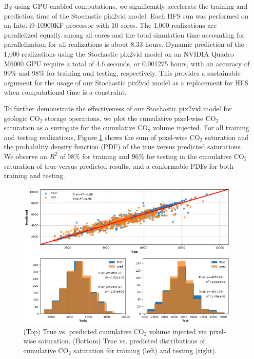 \documentclass[10pt, twoside]{article}
\begin{document}
By using GPU-enabled computations, we significantly accelerate the training and prediction time of the Stochastic pix2vid model. Each HFS run was performed on an Intel \textregistered i9-10900KF processor with 10 cores. The 1,000 realizations are parallelized equally among all cores and the total simulation time accounting for parallelization for all realizations is about 8.33 hours. Dynamic prediction of the 1,000 realizations using the Stochastic pix2vid model on an NVIDIA Quadro M6000 GPU require a total of 4.6 seconds, or 0.001275 hours, with an accuracy of 99\% and 98\% for training and testing, respectively. This provides a sustainable argument for the usage of our Stochastic pix2vid model as a replacement for HFS when computational time is a constraint.

To further demonstrate the effectiveness of our Stochastic pix2vid model for geologic CO$_2$ storage operations, we plot the cumulative pixel-wise CO$_2$ saturation as a surrogate for the cumulative CO$_2$ volume injected. For all training and testing realizations, Figure \ref{co2_pvi} shows the sum of pixel-wise CO$_2$ saturation and the probability density function (PDF) of the true versus predicted saturations. We observe an $R^2$ of 98\% for training and 96\% for testing in the cumulative CO$_2$ saturation of true versus predicted results, and a conformable PDFs for both training and testing.

\begin{figure}
    \centering
    \includegraphics[width=16cm]{figures/co2_pvi.png}
    \caption{(Top) True vs. predicted cumulative CO$_2$ volume injected via pixel-wise saturation. (Bottom) True vs. predicted distributions of cumulative CO$_2$ saturation for training (left) and testing (right).}
    \label{co2_pvi}
\end{figure}
\end{document}
